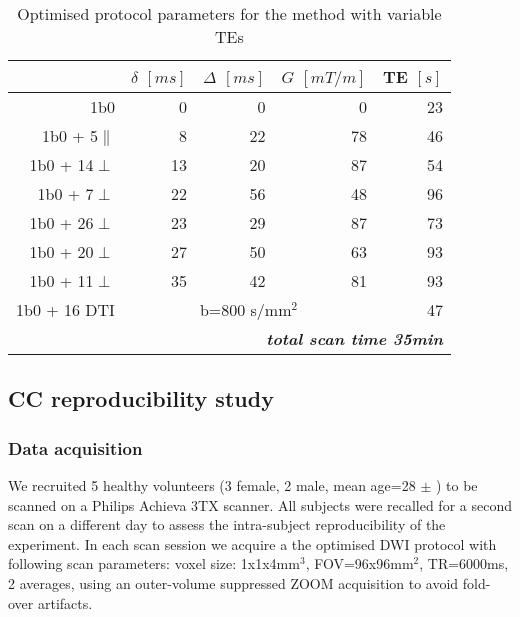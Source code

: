 \begin{table}[htbp]
  \centering
  \caption{Optimised protocol parameters for the \SFasym{} method with variable TEs}
    \begin{tabular}{rrrrr}
    \toprule
    	  & $\delta$ $[ms]$   & $\Delta$ $[ms]$ & $G$ $[mT/m]$ & TE $[s]$\\
    \midrule
    {1b0} & {0} & {0} & {0} & {23} \\
    {1b0 + 5$\parallel$} & {8} & {22} & {78} & {46} \\
    {1b0 + 14$\perp$} & {13} & {20} & {87} & {54} \\
    {1b0 + 7$\perp$} & {22} & {56} & {48} & {96} \\
    {1b0 + 26$\perp$} & {23} & {29} & {87} & {73} \\
    {1b0 + 20$\perp$} & {27} & {50} & {63} & {93} \\
    {1b0 + 11$\perp$} & {35} & {42} & {81} & {93} \\
    {1b0 + 16 DTI} & \multicolumn{3}{c}{{b=800 s/mm$^2$}} & {47} \\
    \midrule
    \multicolumn{5}{r}{\textit{\textbf{total scan time 35min}}} \\
    \bottomrule
    \end{tabular}%
  \label{tab:chap9 protocol table}%
\end{table}%

\subsection{CC reproducibility study}
\subsubsection*{Data acquisition}
We recruited 5 healthy volunteers (3 female, 2 male, mean age=28 $\pm$ ) to be scanned on a Philips Achieva 3TX scanner. All subjects were recalled for a second scan on a different day to assess the intra-subject reproducibility of the experiment. In each scan session we acquire a the optimised \SF{} DWI protocol with following scan parameters: voxel size: 1x1x4mm$^3$, FOV=96x96mm$^2$, TR=6000ms, 2 averages, using an outer-volume suppressed ZOOM acquisition \citep{Wilm:2007} to avoid fold-over artifacts.  
